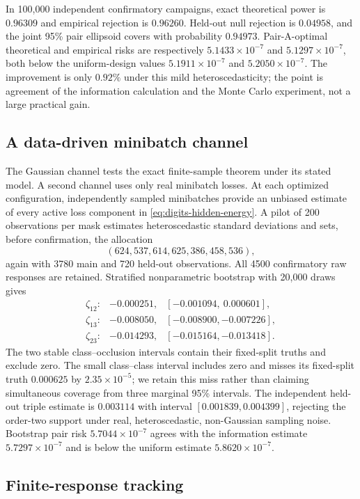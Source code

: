 In 100,000 independent confirmatory campaigns, exact theoretical power is
$0.96309$ and empirical rejection is $0.96260$.  Held-out null rejection is
$0.04958$, and the joint 95\% pair ellipsoid covers with probability
$0.94973$.  Pair-A-optimal theoretical and empirical risks are respectively
$5.1433\times10^{-7}$ and $5.1297\times10^{-7}$, both below the uniform-design
values $5.1911\times10^{-7}$ and $5.2050\times10^{-7}$.  The improvement is
only $0.92\%$ under this mild heteroscedasticity; the point is agreement of
the information calculation and the Monte Carlo experiment, not a large
practical gain.

\subsection{A data-driven minibatch channel}

The Gaussian channel tests the exact finite-sample theorem under its stated
model.  A second channel uses only real minibatch losses.  At each optimized
configuration, independently sampled minibatches provide an unbiased estimate
of every active loss component in \cref{eq:digits-hidden-energy}.  A pilot of
200 observations per mask estimates heteroscedastic standard deviations and
sets, before confirmation, the allocation
\[
(624,537,614,625,386,458,536),
\]
again with 3780 main and 720 held-out observations.  All 4500 confirmatory raw
responses are retained.  Stratified nonparametric bootstrap with 20,000 draws
gives
\[
\begin{array}{ccl}
\zeta_{12}:&-0.000251,&[-0.001094,\ 0.000601],\\
\zeta_{13}:&-0.008050,&[-0.008900,-0.007226],\\
\zeta_{23}:&-0.014293,&[-0.015164,-0.013418].
\end{array}
\]
The two stable class--occlusion intervals contain their fixed-split truths and
exclude zero.  The small class--class interval includes zero and misses its
fixed-split truth $0.000625$ by $2.35\times10^{-5}$; we retain this miss rather
than claiming simultaneous coverage from three marginal 95\% intervals.  The
independent held-out triple estimate is $0.003114$ with interval
$[0.001839,0.004399]$, rejecting the order-two support under real,
heteroscedastic, non-Gaussian sampling noise.  Bootstrap pair risk
$5.7044\times10^{-7}$ agrees with the information estimate
$5.7297\times10^{-7}$ and is below the uniform estimate
$5.8620\times10^{-7}$.

\subsection{Finite-response tracking}

